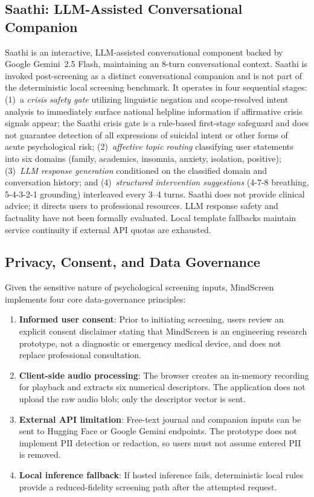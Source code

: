 \documentclass[10pt, conference, letterpaper]{IEEEtran}
\begin{document}
\subsection{Saathi: LLM-Assisted Conversational Companion}
\label{sec:saathi}

Saathi is an interactive, LLM-assisted conversational component backed by
Google Gemini~2.5 Flash, maintaining an 8-turn conversational context.
Saathi is invoked post-screening as a distinct conversational companion and is
not part of the deterministic local screening benchmark.
It operates in four sequential stages:
(1)~a \textit{crisis safety gate} utilizing linguistic negation and
scope-resolved intent analysis to immediately surface national helpline
information if affirmative crisis signals appear; the Saathi crisis gate is a
rule-based first-stage safeguard and does not guarantee detection of all
expressions of suicidal intent or other forms of acute psychological risk;
(2)~\textit{affective topic routing} classifying user statements into six
domains (family, academics, insomnia, anxiety, isolation, positive);
(3)~\textit{LLM response generation} conditioned on the classified domain and
conversation history; and
(4)~\textit{structured intervention suggestions} (4-7-8 breathing, 5-4-3-2-1
grounding) interleaved every 3--4 turns.
Saathi does not provide clinical advice; it directs users to professional
resources.
LLM response safety and factuality have not been formally evaluated.
Local template fallbacks maintain service continuity if external API quotas
are exhausted.

\subsection{Privacy, Consent, and Data Governance}
\label{sec:privacy}

Given the sensitive nature of psychological screening inputs, MindScreen implements
four core data-governance principles:
\begin{enumerate}
  \item \textbf{Informed user consent}: Prior to initiating screening, users review
    an explicit consent disclaimer stating that MindScreen is an engineering research
    prototype, not a diagnostic or emergency medical device, and does not replace professional
    consultation.
  \item \textbf{Client-side audio processing}: The browser creates an in-memory
    recording for playback and extracts six numerical descriptors. The application
    does not upload the raw audio blob; only the descriptor vector is sent.
  \item \textbf{External API limitation}: Free-text journal and companion inputs
    can be sent to Hugging Face or Google Gemini endpoints. The prototype does not
    implement PII detection or redaction, so users must not assume entered PII is removed.
  \item \textbf{Local inference fallback}: If hosted inference fails, deterministic
    local rules provide a reduced-fidelity screening path after the attempted request.
\end{enumerate}
\end{document}
